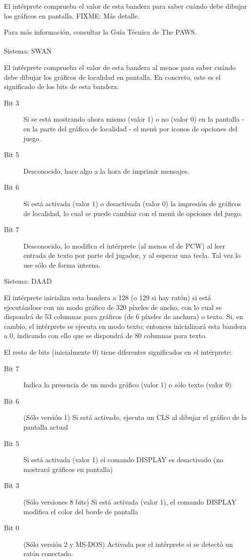 \documentclass[11pt, a5paper]{article}
\newcommand{\paw}{\textsf{The PAWS}\xspace}
\newcommand{\swan}{\textsf{SWAN}\xspace}
\newcommand{\daad}{\textsf{DAAD}\xspace}
\newcommand{\sistema}[1]{\noindent Sistema: #1 \nopagebreak}
\begin{document}
El intérprete comprueba el valor de esta bandera para saber cuándo debe dibujar los gráficos en pantalla. FIXME: Más detalle.

Para más información, consultar la Guía Técnica de \paw \cite{PawsZX}.
\\\ \\
\sistema{\swan}

El intérprete comprueba el valor de esta bandera al menos para saber cuándo debe dibujar los gráficos de localidad en pantalla. En concreto, este es el significado de los bits de esta bandera:

\begin{description}
  \item[Bit 3] Si se está mostrando ahora mismo (valor 1) o no (valor 0) en la pantalla - en la parte del gráfico de localidad - el menú por iconos de opciones del juego.
  \item[Bit 5] Desconocido, hace algo a la hora de imprimir mensajes.
  \item[Bit 6] Si está activada (valor 1) o desactivada (valor 0) la impresión de gráficos de localidad, lo cual se puede cambiar con el menú de opciones del juego.
  \item[Bit 7] Desconocido, lo modifica el intérprete (al menos el de PCW) al leer entrada de texto por parte del jugador, y al esperar una tecla. Tal vez lo use sólo de forma interna.
\end{description}

\sistema{\daad}

El intérprete inicializa esta bandera a 128 (o 129 si hay ratón) si está ejecutándose con un modo gráfico de 320 píxeles de ancho, con lo cual se dispondrá de 53 columnas para gráficos (de 6 píxeles de anchura) o texto. Si, en cambio, el intérprete se ejecuta en modo texto; entonces inicializará esta bandera a 0, indicando con ello que se dispondrá de 80 columnas para texto.

El resto de bits (inicialmente 0) tiene diferentes significados en el intérprete:

\begin{description}
  \item[Bit 7] Indica la presencia de un modo gráfico (valor 1) o sólo texto (valor 0)
  \item[Bit 6] (Sólo versión 1) Si está activado, ejecuta un CLS al dibujar el gráfico de la pantalla actual
  \item[Bit 5] Si está activada (valor 1) el comando DISPLAY es desactivado (no mostrará gráficos en pantalla)
  \item[Bit 3] (Sólo versiones 8 bits) Si está activada (valor 1), el comando DISPLAY modifica el color del borde de pantalla
  \item[Bit 0] (Sólo versión 2 y MS-DOS) Activada por el intérprete si se detectó un ratón conectado.
\end{description}
\end{document}
